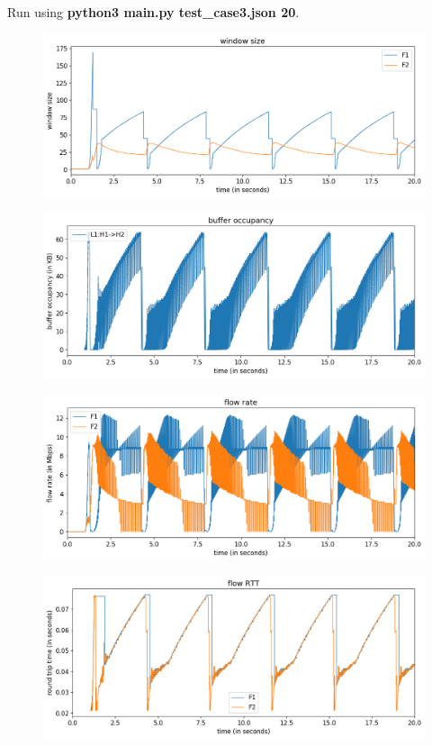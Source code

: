 \documentclass{article}
\begin{document}
Run using \textbf{python3 main.py test\_case3.json 20}.

\begin{figure}[H]
\centering
\includegraphics[width = \textwidth]{"test_case3 window size"}
\end{figure}

\begin{figure}[H]
\centering
\includegraphics[width = \textwidth]{"test_case3 buffer occupancy"}
\end{figure}

\begin{figure}[H]
\centering
\includegraphics[width = \textwidth]{"test_case3 flow rate"}
\end{figure}

\begin{figure}[H]
\centering
\includegraphics[width = \textwidth]{"test_case3 flow RTT"}
\end{figure}
\end{document}
